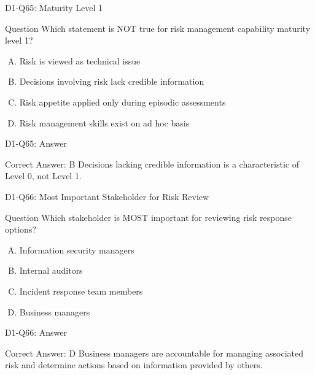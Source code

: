 \documentclass{beamer}
\begin{document}
	\begin{frame}{D1-Q65: Maturity Level 1}
		\begin{block}{Question}
			Which statement is NOT true for risk management capability maturity level 1?
		\end{block}
		\begin{enumerate}[(A)]
			\item Risk is viewed as technical issue
			\item Decisions involving risk lack credible information
			\item Risk appetite applied only during episodic assessments
			\item Risk management skills exist on ad hoc basis
		\end{enumerate}
	\end{frame}
	\begin{frame}{D1-Q65: Answer}
		\begin{block}{Correct Answer: B}
			Decisions lacking credible information is a characteristic of Level 0, not Level 1.
		\end{block}
	\end{frame}
	
	\begin{frame}{D1-Q66: Most Important Stakeholder for Risk Review}
		\begin{block}{Question}
			Which stakeholder is MOST important for reviewing risk response options?
		\end{block}
		\begin{enumerate}[(A)]
			\item Information security managers
			\item Internal auditors
			\item Incident response team members
			\item Business managers
		\end{enumerate}
	\end{frame}
	\begin{frame}{D1-Q66: Answer}
		\begin{block}{Correct Answer: D}
			Business managers are accountable for managing associated risk and determine actions based on information provided by others.
		\end{block}
	\end{frame}
	
\end{document}
